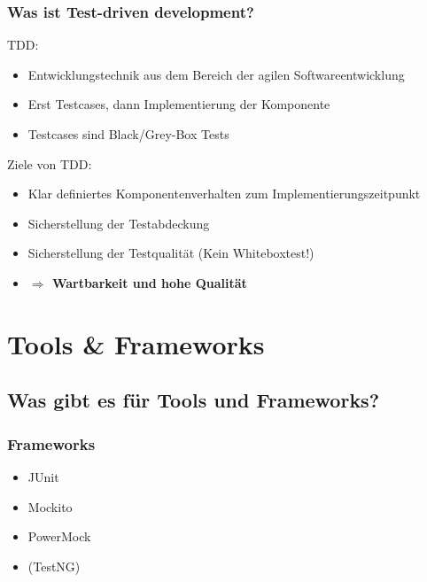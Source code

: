 \documentclass{beamer}
\begin{document}
			\begin{frame}
				\frametitle{Was ist Test-driven development?}
				
				TDD:
				\begin{itemize}
					\item{Entwicklungstechnik aus dem Bereich der agilen Softwareentwicklung}
					\item{Erst Testcases, dann Implementierung der Komponente}
					\item{Testcases sind Black/Grey-Box Tests}
				\end{itemize}
				\pause
				Ziele von TDD:
				\begin{itemize}
					\item{Klar definiertes Komponentenverhalten zum Implementierungszeitpunkt}
					\item{Sicherstellung der Testabdeckung} %
					\item{Sicherstellung der Testqualität (Kein Whiteboxtest!)} %
					\item[]{\color{red}\textbf{$\Rightarrow$ Wartbarkeit und hohe Qualität}}
				\end{itemize}
			\end{frame}

	
	\section{Tools \& Frameworks}

		\subsection{Was gibt es für Tools und Frameworks?}

			\begin{frame}
				\frametitle{Frameworks}

				\begin{itemize}
					\item{JUnit}
					\item{Mockito}
					\item{PowerMock}
					\item{(TestNG)}
				\end{itemize}
			\end{frame}
\end{document}
